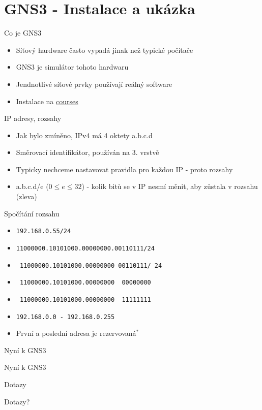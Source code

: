 \documentclass[aspectratio=1610]{beamer}
\begin{document}
\section{GNS3 - Instalace a ukázka}

\begin{frame}{Co je GNS3}

\begin{itemize}
  \item Síťový hardware často vypadá jinak než typické počítače
  \item GNS3 je simulátor tohoto hardwaru
  \item Jendnotlivé síťové prvky používají reálný software
  \item Instalace na \href{https://courses.fit.cvut.cz/BI-PSI/labs/tasks_home_study/manuals/manual-gns3.html}{courses}
\end{itemize}

\end{frame}

\begin{frame}{IP adresy, rozsahy}

\begin{itemize}
  \item Jak bylo zmíněno, IPv4 má 4 oktety a.b.c.d
  \item Směrovací identifikátor, používán na 3. vrstvě
  \item Typicky nechceme nastavovat pravidla pro každou IP - proto rozsahy
  \item a.b.c.d/e ($0 \leq e \leq 32$) - kolik bitů se v IP nesmí měnit, aby zůstala v rozsahu (zleva)
\end{itemize}

\end{frame}

\begin{frame}{Spočítání rozsahu}

\begin{itemize}
  \item \texttt{192.168.0.55/24}
  \item \texttt{11000000.10101000.00000000.00110111/24}
  \item \texttt{{\color{red} 11000000.10101000.00000000} 00110111/ {\color{red}24}}
  \item \texttt{{\color{red} 11000000.10101000.00000000} {\color{blue} 00000000}}
  \item \texttt{{\color{red} 11000000.10101000.00000000} {\color{brown} 11111111}}
  \item \texttt{192.168.0.{\color{blue}0} - 192.168.0.{\color{brown}255}}
  \item První a poslední adresa je rezervovaná$^*$
\end{itemize}

\end{frame}

\begin{frame}{Nyní k GNS3}

\centering
\large
Nyní k GNS3

\end{frame}

\begin{frame}{Dotazy}

\centering
\large
Dotazy?

\end{frame}

\printbibliography[title={Zdroje}]
\end{document}
